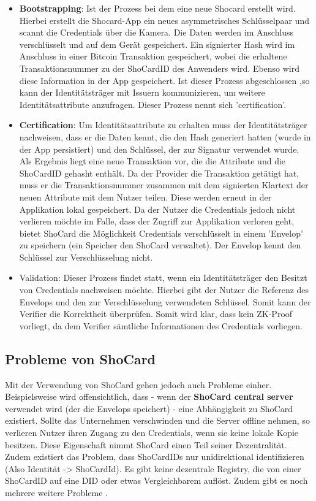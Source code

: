 \begin{itemize}
	\item \textbf{Bootstrapping}: Ist der Prozess bei dem eine neue Shocard erstellt wird. Hierbei erstellt die Shocard-App ein neues asymmetrisches Schlüsselpaar und scannt die Credentials über die Kamera. Die Daten werden im Anschluss verschlüsselt und auf dem Gerät gespeichert. Ein signierter Hash wird im Anschluss in einer Bitcoin Transaktion gespeichert, wobei die erhaltene Transaktionsnummer zu der ShoCardID des Anwenders wird. Ebenso wird diese Information in der App gespeichert. Ist dieser Prozess abgeschlossen ,so kann der Identitätsträger mit Issuern kommunizieren, um weitere Identitätsattribute anzufragen. Dieser Prozess nennt sich 'certification'.
	\item \textbf{Certification}: Um Identitätsattribute zu erhalten muss der Identitätsträger nachweisen, dass er die Daten kennt, die den Hash generiert hatten (wurde in der App persistiert) und den Schlüssel, der zur Signatur verwendet wurde. Als Ergebnis liegt eine neue Transaktion vor, die die Attribute und die ShoCardID gehasht enthält. Da der Provider die Transaktion getätigt hat, muss er die Transaktionsnummer zusammen mit dem signierten Klartext der neuen Attribute mit dem Nutzer teilen. Diese werden erneut in der Applikation lokal gespeichert. Da der Nutzer die Credentials jedoch nicht verlieren möchte im Falle, dass der Zugriff zur Applikation verloren geht, bietet ShoCard die Möglichkeit Credentials verschlüsselt in einem 'Envelop' zu speichern (ein Speicher den ShoCard verwaltet). Der Envelop kennt den Schlüssel zur Verschlüsselung nicht.
	\item Validation: Dieser Prozess findet statt, wenn ein Identitätsträger den Besitzt von Credentials nachweisen möchte. Hierbei gibt der Nutzer die Referenz des Envelops und den zur Verschlüsselung verwendeten Schlüssel. Somit kann der Verifier die Korrektheit überprüfen. Somit wird klar, dass kein ZK-Proof vorliegt, da dem Verifier sämtliche Informationen des Credentials vorliegen.	
\end{itemize}

\subsection{Probleme von ShoCard}
\label{shocard}
Mit der Verwendung von ShoCard gehen jedoch auch Probleme einher. Beispielsweise wird offensichtlich, dass - wenn der \textbf{ShoCard central server} verwendet wird (der die Envelops speichert) - eine Abhängigkeit zu ShoCard existiert. Sollte das Unternehmen verschwinden und die Server offline nehmen, so verlieren Nutzer ihren Zugang zu den Credentials, wenn sie keine lokale Kopie besitzen. Diese Eigenschaft nimmt ShoCard einen Teil seiner Dezentralität. Zudem existiert das Problem, dass ShoCardIDs nur unidirektional identifizieren (Also Identität -> ShoCardId). Es gibt keine dezentrale Registry, die von einer ShoCardID auf eine DID oder etwas Vergleichbarem auflöst. Zudem gibt es noch mehrere weitere Probleme \cite{ID46}.


